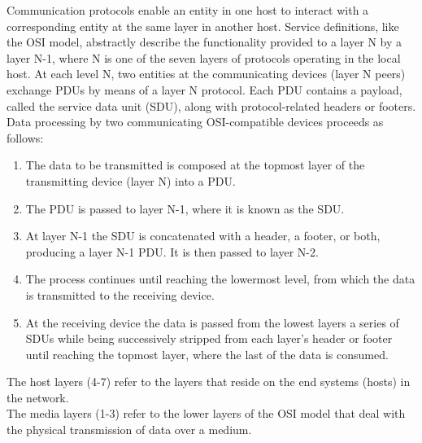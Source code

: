 \documentclass{article}
\begin{document}
	Communication protocols enable an entity in one host to interact with a corresponding entity at the same layer in another host. Service definitions, like the OSI model, abstractly describe the functionality provided to a layer N by a layer N-1, where N is one of the seven layers of protocols operating in the local host. At each level N, two entities at the communicating devices (layer N peers) exchange PDUs by means of a layer N protocol. Each PDU contains a payload, called the service data unit (SDU), along with protocol-related headers or footers.\\

Data processing by two communicating OSI-compatible devices proceeds as follows: 
\begin{enumerate}[label = \arabic*]
\item The data to be transmitted is composed at the topmost layer of the transmitting device (layer N) into a PDU.
\item The PDU is passed to layer N-1, where it is known as the SDU.
\item At layer N-1 the SDU is concatenated with a header, a footer, or both, producing a layer N-1 PDU. It is then passed to layer N-2.
\item The process continues until reaching the lowermost level, from which the data is transmitted to the receiving device.
\item At the receiving device the data is passed from the lowest layers a series of SDUs while being successively stripped from each layer's header or footer until reaching the topmost layer, where the last of the data is consumed.
\end{enumerate}

\noindent The host layers (4-7) refer to the layers that reside on the end systems (hosts) in the network.\\
The media layers (1-3) refer to the lower layers of the OSI model that deal with the physical transmission of data over a medium.
\end{document}
